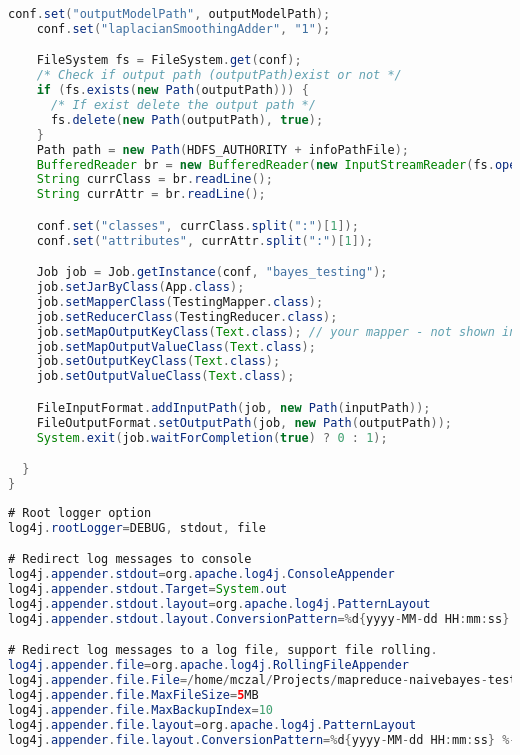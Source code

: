 \begin{lstlisting}[language=Java,basicstyle=\tiny,caption=App.java]
    conf.set("outputModelPath", outputModelPath);
    conf.set("laplacianSmoothingAdder", "1");

    FileSystem fs = FileSystem.get(conf);
    /* Check if output path (outputPath)exist or not */
    if (fs.exists(new Path(outputPath))) {
      /* If exist delete the output path */
      fs.delete(new Path(outputPath), true);
    }
    Path path = new Path(HDFS_AUTHORITY + infoPathFile);
    BufferedReader br = new BufferedReader(new InputStreamReader(fs.open(path)));
    String currClass = br.readLine();
    String currAttr = br.readLine();

    conf.set("classes", currClass.split(":")[1]);
    conf.set("attributes", currAttr.split(":")[1]);

    Job job = Job.getInstance(conf, "bayes_testing");
    job.setJarByClass(App.class);
    job.setMapperClass(TestingMapper.class);
    job.setReducerClass(TestingReducer.class);
    job.setMapOutputKeyClass(Text.class); // your mapper - not shown in this example
    job.setMapOutputValueClass(Text.class);
    job.setOutputKeyClass(Text.class);
    job.setOutputValueClass(Text.class);

    FileInputFormat.addInputPath(job, new Path(inputPath));
    FileOutputFormat.setOutputPath(job, new Path(outputPath));
    System.exit(job.waitForCompletion(true) ? 0 : 1);

  }
}
\end{lstlisting}


\begin{lstlisting}[language=Java,basicstyle=\tiny,caption=log4j.properties]
# Root logger option
log4j.rootLogger=DEBUG, stdout, file

# Redirect log messages to console
log4j.appender.stdout=org.apache.log4j.ConsoleAppender
log4j.appender.stdout.Target=System.out
log4j.appender.stdout.layout=org.apache.log4j.PatternLayout
log4j.appender.stdout.layout.ConversionPattern=%d{yyyy-MM-dd HH:mm:ss} %-5p %c{1}:%L - %m%n

# Redirect log messages to a log file, support file rolling.
log4j.appender.file=org.apache.log4j.RollingFileAppender
log4j.appender.file.File=/home/mczal/Projects/mapreduce-naivebayes-testing/logs/app.log
log4j.appender.file.MaxFileSize=5MB
log4j.appender.file.MaxBackupIndex=10
log4j.appender.file.layout=org.apache.log4j.PatternLayout
log4j.appender.file.layout.ConversionPattern=%d{yyyy-MM-dd HH:mm:ss} %-5p %c{1}:%L - %m%n
\end{lstlisting}